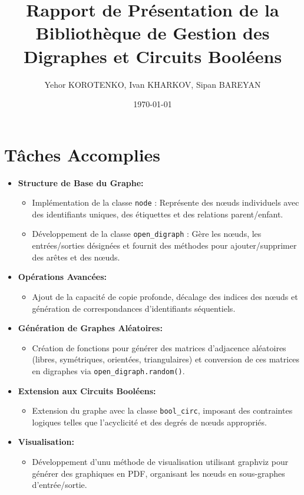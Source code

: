 \documentclass{article}
\title{Rapport de Présentation de la Bibliothèque de Gestion des Digraphes et Circuits Booléens}
\author{Yehor KOROTENKO, Ivan KHARKOV, Sipan BAREYAN}
\date{\today}
\begin{document}
\maketitle

\section{Tâches Accomplies}
\begin{itemize}
    \item \textbf{Structure de Base du Graphe:}
    \begin{itemize}
        \item Implémentation de la classe \texttt{node} : Représente des nœuds individuels avec des identifiants uniques, des étiquettes et des relations parent/enfant.
        \item Développement de la classe \texttt{open\_digraph} : Gère les nœuds, les entrées/sorties désignées et fournit des méthodes pour ajouter/supprimer des arêtes et des nœuds.
    \end{itemize}
    \item \textbf{Opérations Avancées:}
    \begin{itemize}
        \item Ajout de la capacité de copie profonde, décalage des indices des nœuds et génération de correspondances d'identifiants séquentiels.
    \end{itemize}
    \item \textbf{Génération de Graphes Aléatoires:}
    \begin{itemize}
        \item Création de fonctions pour générer des matrices d'adjacence aléatoires (libres, symétriques, orientées, triangulaires) et conversion de ces matrices en digraphes via \texttt{open\_digraph.random()}.
    \end{itemize}
    \item \textbf{Extension aux Circuits Booléens:}
    \begin{itemize}
        \item Extension du graphe avec la classe \texttt{bool\_circ}, imposant des contraintes logiques telles que l'acyclicité et des degrés de nœuds appropriés.
    \end{itemize}
    \item \textbf{Visualisation:}
    \begin{itemize}
        \item Développement d'unu méthode de visualisation utilisant graphviz pour générer des graphiques en PDF, organisant les nœuds en sous-graphes d'entrée/sortie.

\end{itemize}
\end{itemize}
\end{document}
